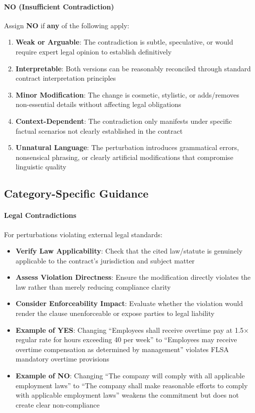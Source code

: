 \documentclass[11pt]{article}
\begin{document}
\paragraph{NO (Insufficient Contradiction)} Assign \textbf{NO} if \textbf{any} of the following apply:
\begin{enumerate}[leftmargin=*,itemsep=0.1em]
    \item \textbf{Weak or Arguable}: The contradiction is subtle, speculative, or would require expert legal opinion to establish definitively
    \item \textbf{Interpretable}: Both versions can be reasonably reconciled through standard contract interpretation principles
    \item \textbf{Minor Modification}: The change is cosmetic, stylistic, or adds/removes non-essential details without affecting legal obligations
    \item \textbf{Context-Dependent}: The contradiction only manifests under specific factual scenarios not clearly established in the contract
    \item \textbf{Unnatural Language}: The perturbation introduces grammatical errors, nonsensical phrasing, or clearly artificial modifications that compromise linguistic quality
\end{enumerate}

\subsection{Category-Specific Guidance}

\paragraph{Legal Contradictions} For perturbations violating external legal standards:
\begin{itemize}[leftmargin=*,itemsep=0.1em]
    \item \textbf{Verify Law Applicability}: Check that the cited law/statute is genuinely applicable to the contract's jurisdiction and subject matter
    \item \textbf{Assess Violation Directness}: Ensure the modification directly violates the law rather than merely reducing compliance clarity
    \item \textbf{Consider Enforceability Impact}: Evaluate whether the violation would render the clause unenforceable or expose parties to legal liability
    \item \textbf{Example of YES}: Changing ``Employees shall receive overtime pay at 1.5× regular rate for hours exceeding 40 per week'' to ``Employees may receive overtime compensation as determined by management'' violates FLSA mandatory overtime provisions
    \item \textbf{Example of NO}: Changing ``The company will comply with all applicable employment laws'' to ``The company shall make reasonable efforts to comply with applicable employment laws'' weakens the commitment but does not create clear non-compliance
\end{itemize}
\end{document}
